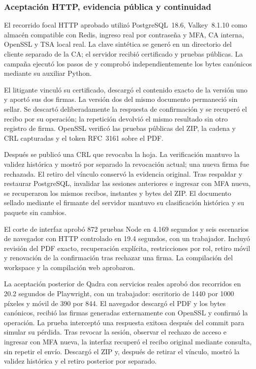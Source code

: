 \subsubsection{Aceptación HTTP, evidencia pública y continuidad}

El recorrido focal HTTP aprobado utilizó PostgreSQL~18.6, Valkey~8.1.10 como
almacén compatible con Redis, ingreso real por contraseña y MFA, CA interna,
OpenSSL y TSA local real. La clave sintética se generó en un directorio del
cliente separado de la CA; el servidor recibió certificado y pruebas públicas.
La campaña ejecutó los pasos de
 y comprobó independientemente
los bytes canónicos mediante su auxiliar Python.

El litigante vinculó su certificado, descargó el contenido exacto de la versión
uno y aportó sus dos firmas. La versión dos del mismo documento permaneció
sin sellar. Se descartó deliberadamente la respuesta de confirmación y se
recuperó el recibo por su operación; la repetición devolvió el mismo resultado
sin otro registro de firma. OpenSSL verificó las pruebas públicas del ZIP,
la cadena y CRL capturadas y el token RFC~3161 sobre el PDF.

Después se publicó una CRL que revocaba la hoja. La verificación mantuvo la
validez histórica y mostró por separado la revocación actual; una nueva firma
fue rechazada. El retiro del vínculo conservó la evidencia original. Tras
respaldar y restaurar PostgreSQL, invalidar las sesiones anteriores e ingresar
con MFA nueva, se recuperaron los mismos recibos, instantes y bytes del ZIP.
El documento sellado mediante el firmante del servidor mantuvo su clasificación
histórica y su paquete sin cambios.

El corte de interfaz aprobó 872 pruebas Node en 4.169 segundos y seis escenarios
de navegador con HTTP controlado en 19.4 segundos, con un trabajador. Incluyó
revisión del PDF exacto, recuperación explícita, restricciones por rol, retiro
móvil y renovación de la confirmación tras rechazar una firma. La compilación
del workspace y la compilación web aprobaron.

La aceptación posterior de Qadra con servicios reales aprobó dos recorridos
en 20.2 segundos de Playwright, con un trabajador: escritorio de 1440 por
1000 píxeles y móvil de 390 por 844. El navegador descargó el PDF y los bytes
canónicos, recibió las firmas generadas externamente con OpenSSL y confirmó
la operación. La prueba interceptó una respuesta exitosa después del commit
para simular su pérdida. Tras revocar la sesión, observar el rechazo de acceso
e ingresar con MFA nueva, la interfaz recuperó el recibo original mediante
consulta, sin repetir el envío. Descargó el ZIP y, después de retirar el
vínculo, mostró la validez histórica y el retiro posterior por separado.

